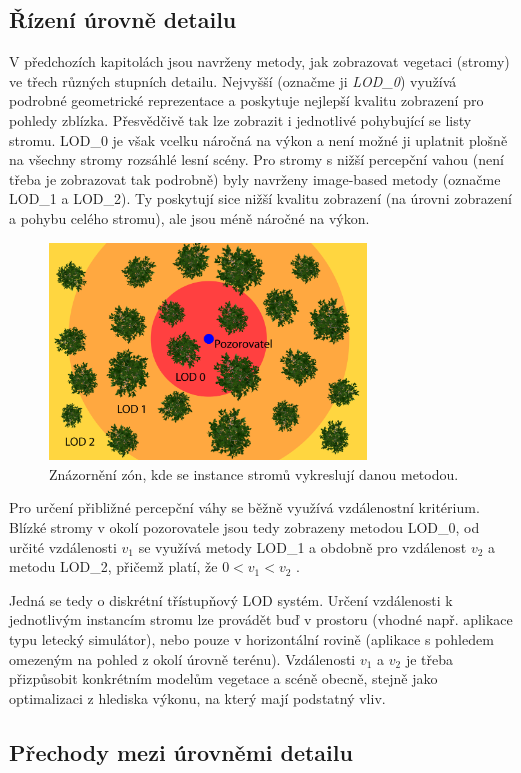 \pagebreak
\subsection{Řízení úrovně detailu}
\label{sec-LODcontrol}
V předchozích kapitolách jsou navrženy metody, jak zobrazovat vegetaci (stromy) ve třech různých stupních detailu. Nejvyšší (označme ji \emph{LOD\_0}) využívá podrobné geometrické reprezentace a poskytuje nejlepší kvalitu zobrazení pro pohledy zblízka. Přesvědčivě tak lze zobrazit i jednotlivé pohybující se listy stromu. LOD\_0 je však vcelku náročná na výkon a není možné ji uplatnit plošně na všechny stromy rozsáhlé lesní scény. Pro stromy s nižší percepční vahou (není třeba je zobrazovat tak podrobně) byly navrženy image-based metody (označme LOD\_1 a LOD\_2). Ty poskytují sice nižší kvalitu zobrazení (na úrovni zobrazení a pohybu celého stromu), ale jsou méně náročné na výkon. 
\begin{figure}[!hbt]
\begin{center}
\includegraphics[width=0.75\textwidth]{./figures/LODcontrol.png}
\caption{Znázornění zón, kde se instance stromů vykreslují danou metodou.\label{fig:lodZones}}
\end{center}
\end{figure}

Pro určení přibližné percepční váhy se běžně využívá vzdálenostní kritérium. Blízké stromy v okolí pozorovatele jsou tedy zobrazeny metodou LOD\_0, od určité vzdálenosti $v_1$ se využívá metody LOD\_1 a obdobně pro vzdálenost $v_2$ a metodu LOD\_2, přičemž platí, že $0<v_1<v_2$ .

Jedná se tedy o diskrétní třístupňový LOD systém. Určení vzdálenosti k jednotlivým instancím stromu lze provádět buď v prostoru (vhodné např. aplikace typu letecký simulátor), nebo pouze v horizontální rovině (aplikace s pohledem omezeným na pohled z okolí úrovně terénu). Vzdálenosti $v_1$ a $v_2$ je třeba přizpůsobit konkrétním modelům vegetace a scéně obecně, stejně jako optimalizaci z hlediska výkonu, na který mají podstatný vliv.


\subsection{Přechody mezi úrovněmi detailu}
\label{sec-LODtransitions}